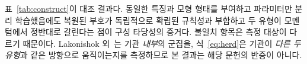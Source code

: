 표~\ref{tab:construct}이 대조 결과다. 동일한 특징과 모형 형태를 부여하고 파라미터만
분리 학습했음에도 복원된 부호가 독립적으로 확립된 규칙성과 부합하고 두 유형이
모멘텀에서 정반대로 갈린다는 점이 구성 타당성의 증거다. 불일치 항목은 측정 대상이
다르기 때문이다. Lakonishok 외~\cite{lakonishok1992impact}는 기관 \emph{내부}의
군집을, 식~\eqref{eq:herd}은 기관이 \emph{다른 두 유형}과 같은 방향으로 움직이는지를
측정하므로 본 결과는 해당 문헌의 반증이 아니다.
